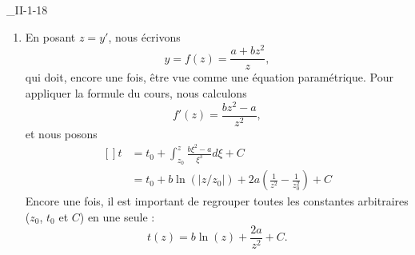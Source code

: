 \begin{corrige}{_II-1-18}
\begin{enumerate}
		Si $a=b=1$, nous avons les possibilités
		\begin{enumerate}

			\item
				Si $| t_0 |>2$, deux solutions,
			\item
				Si $| t_0 |<2$, pas de solutions,
			\item
				Si $| t_0 |=2$, une seule solutions.

		\end{enumerate}
		
		Si par contre $a=-1=b$, alors nous avons
		\begin{equation}
			z_0=\frac{ t_0\pm\sqrt{t_0^2+4} }{ -2 },
		\end{equation}
		et donc toujours deux solutions.

		Dans tous les cas, la solution se trouve sous forme paramétrique
		\begin{subequations}
			\begin{numcases}{}
				t(z)=\frac{ a+bz^2 }{ z },\\
				y(z)=\frac{ b }{2}z^2-a\ln(z)+C.
			\end{numcases}
		\end{subequations}
		Une fois que $z_0$ est trouvé en fonction de $t_0$, il convient de résoudre $y(z_0)=y_0$ pour fixer la constante $C$.

	\item
		En posant $z=y'$, nous écrivons
		\begin{equation}
			y=f(z)=\frac{ a+bz^2 }{ z },
		\end{equation}
		qui doit, encore une fois, être vue comme une équation paramétrique. Pour appliquer la formule du cours, nous calculons
		\begin{equation}
			f'(z)=\frac{ bz^2-a }{ z^2 },
		\end{equation}
		et nous posons
		\begin{equation}
			\begin{aligned}[]
				t	&=t_0+\int_{z_0}^z\frac{ b\xi^2-a }{ \xi^3 }d\xi+C\\
				&=t_0+b\ln(| z/z_0 |)+2a\left( \frac{1}{ z^2 }-\frac{1}{ z_0^2 } \right)+C
			\end{aligned}
		\end{equation}
		Encore une fois, il est important de regrouper toutes les constantes arbitraires ($z_0$, $t_0$ et $C$) en une seule  :
		\begin{equation}
			t(z)=b\ln(z)+\frac{ 2a }{ z^2 }+C.
		\end{equation}
		

\end{enumerate}
\end{corrige}

